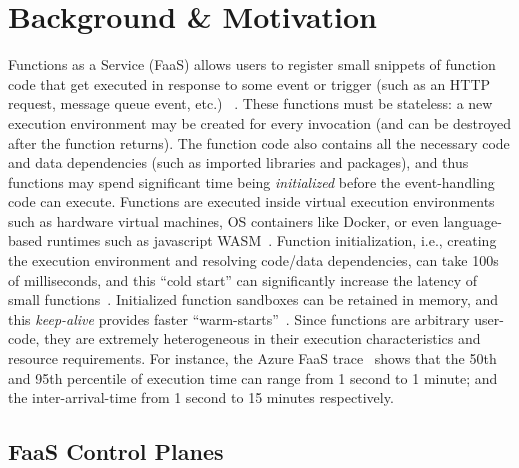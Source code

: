 \section{Background \& Motivation}
\label{sec:bg}

Functions as a Service (FaaS) allows users to register small snippets of function code that get executed in response to some event or trigger (such as an HTTP request, message queue event, etc.)
~\cite{serverless-cacm-21, aws-lambda, google-functions,azure-functions}. 
These functions must be stateless: a new execution environment may be created for every invocation (and can be destroyed after the function returns). 
The function code also contains all the necessary code and data dependencies (such as imported libraries and packages), and thus functions may spend significant time being \emph{initialized} before the event-handling code can execute. 
Functions are executed inside virtual execution environments such as hardware virtual machines, OS containers like Docker, or even language-based runtimes such as javascript WASM~\cite{shillaker2020faasm}.
Function initialization, i.e., creating the execution environment and resolving code/data dependencies, can take 100s of milliseconds, and this ``cold start'' can significantly increase the latency of small functions~\cite{du2020catalyzer, faascache-asplos21}.
Initialized function sandboxes can be retained in memory, and this \emph{keep-alive} provides faster ``warm-starts''~\cite{faascache-asplos21}. 
%
Since functions are arbitrary user-code, they are extremely heterogeneous in their execution characteristics and resource requirements. 
For instance, the Azure FaaS trace~\cite{shahrad_serverless_2020} shows that the 50th and 95th percentile of execution time can range from 1 second to 1 minute; and the inter-arrival-time from 1 second to 15 minutes respectively.

\subsection{FaaS Control Planes}
\label{sec:bg:cplane}

